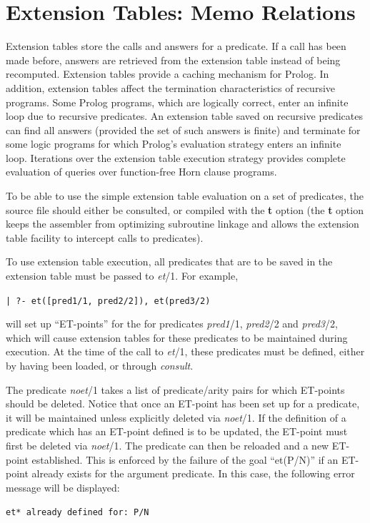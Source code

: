 \section{Extension Tables: Memo Relations}

Extension tables store the calls and answers for a predicate.
If a call has been made before, answers are retrieved from the extension
table instead of being recomputed.
Extension tables provide a caching mechanism for Prolog.
In addition, extension tables affect the termination characteristics
of recursive programs.
Some Prolog programs, which are logically correct,
enter an infinite loop due to recursive predicates.
An extension table saved on recursive predicates can find all answers
(provided the set of such answers is finite) and terminate
for some logic programs for which Prolog's evaluation strategy
enters an infinite loop.
Iterations over the extension table execution strategy provides
complete evaluation of queries over function-free Horn clause programs.

To be able to use the simple extension table evaluation on a set of
predicates, the source file should either be consulted, or
compiled with the {\bf t} option (the {\bf t} option
keeps the assembler from optimizing subroutine linkage and allows
the extension table facility to intercept calls to predicates).

To use extension table execution, all predicates that are to be
saved in the extension table must be passed to {\em et}/1.
For example,
\begin{center}
{\tt | ?- et([pred1/1, pred2/2]), et(pred3/2)}
\end{center}
will set up ``ET-points'' for the for predicates {\em pred1}/1,
{\em pred2}/2 and {\em pred3}/2,
which will cause extension tables for these predicates to be
maintained during execution.
At the time of the call to {\em et}/1, these predicates must be defined,
either by having been loaded, or through {\em consult}.

The predicate {\em noet}/1 takes a list of predicate/arity pairs for
which ET-points should be deleted.
Notice that once an ET-point has been set up for a predicate,
it will be maintained unless explicitly deleted via {\em noet}/1.
If the definition of a predicate which has an ET-point defined is to be updated,
the ET-point must first be deleted via {\em noet}/1.
The predicate can then be reloaded and a new ET-point established.
This is enforced by the failure of the goal ``et(P/N)''
if an ET-point already exists for the argument predicate.
In this case, the following error message will be displayed:
\begin{center}
{\tt *et* already defined for: P/N}
\end{center}

